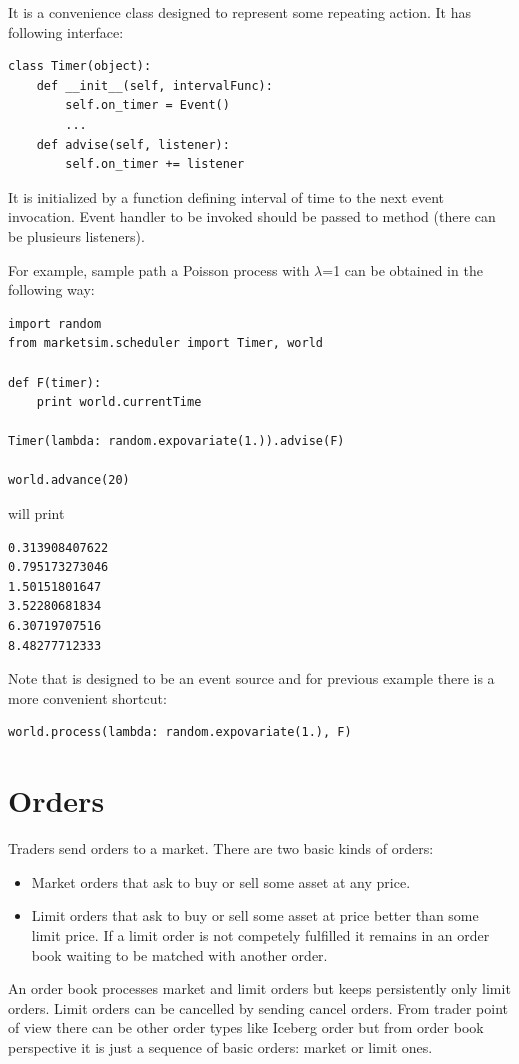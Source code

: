 \documentclass[a4paper,11pt]{article}
\newcommand{\tmtexttt}[1]{{\ttfamily{#1}}}
\begin{document}
It is a convenience class designed to represent some repeating action. It has following interface:

\begin{verbatim}
class Timer(object):
    def __init__(self, intervalFunc):
        self.on_timer = Event()
        ...
    def advise(self, listener):
        self.on_timer += listener
\end{verbatim}

It is initialized by a function defining interval of time to the next event invocation. Event handler to be invoked should be passed to \tmtexttt{advise} method (there can be plusieurs listeners).

For example, sample path a Poisson process with $\lambda$=1 can be obtained in the following way:
\begin{verbatim}
import random
from marketsim.scheduler import Timer, world

def F(timer):
    print world.currentTime
    
Timer(lambda: random.expovariate(1.)).advise(F)

world.advance(20)
\end{verbatim}

will print 

\begin{verbatim}
0.313908407622
0.795173273046
1.50151801647
3.52280681834
6.30719707516
8.48277712333
\end{verbatim}

Note that \tmtexttt{Timer} is designed to be an event source and for previous example there is a more convenient shortcut:

\begin{verbatim}
world.process(lambda: random.expovariate(1.), F)
\end{verbatim}

\section{Orders}

Traders send orders to a market. There are two basic kinds of orders: 
\begin{itemize}
\item Market orders that ask to buy or sell some asset at any price. 
\item Limit orders that ask to buy or sell some asset at price better than some limit price. If a limit order is not competely fulfilled it remains in an order book waiting to be matched with another order.
\end{itemize}
An order book processes market and limit orders but keeps persistently only limit orders. Limit orders can be cancelled by sending cancel orders.
From trader point of view there can be other order types like Iceberg order but from order book perspective it is just a sequence of basic orders: market or limit ones. 
\end{document}
